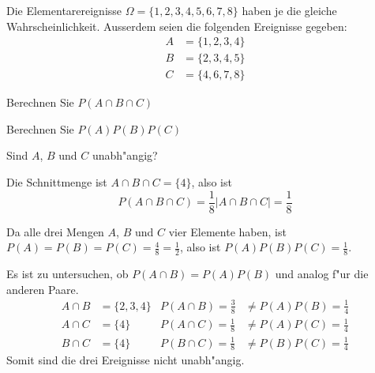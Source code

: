 Die Elementarereignisse $\Omega=\{1,2,3,4,5,6,7,8\}$ haben je die gleiche
Wahrscheinlichkeit. Ausserdem seien die folgenden Ereignisse gegeben:
\begin{align*}
A&=\{1,2,3,4\}\\
B&=\{2,3,4,5\}\\
C&=\{4,6,7,8\}
\end{align*}
\begin{teilaufgaben}
\item Berechnen Sie $P(A\cap B\cap C)$
\item Berechnen Sie $P(A)P(B)P(C)$
\item Sind $A$, $B$ und $C$ unabh"angig?
\end{teilaufgaben}

\begin{loesung}
\begin{teilaufgaben}
\item Die Schnittmenge ist $A\cap B\cap C=\{4\}$, also ist
\[
P(A\cap B\cap C)=\frac18|A\cap B\cap C|=\frac18
\]
\item Da alle drei Mengen $A$, $B$ und $C$ vier Elemente haben,
ist $P(A)=P(B)=P(C)=\frac{4}{8}=\frac12$, also ist
$P(A)P(B)P(C)=\frac18$.
\item Es ist zu untersuchen, ob $P(A\cap B)=P(A)P(B)$ und analog f"ur
die anderen Paare.
\begin{align*}
A\cap B&=\{2,3,4\}&P(A\cap B)=\frac38&\ne P(A)P(B)=\frac14\\
A\cap C&=\{4\}&P(A\cap C)=\frac18&\ne P(A)P(C)=\frac14\\
B\cap C&=\{4\}&P(B\cap C)=\frac18&\ne P(B)P(C)=\frac14
\end{align*}
Somit sind die drei Ereignisse nicht unabh"angig.
\end{teilaufgaben}
\end{loesung}


